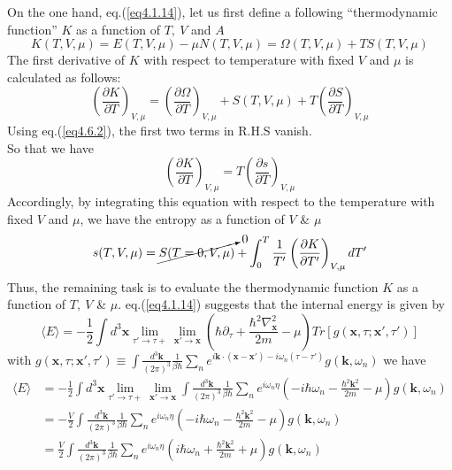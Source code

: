 On the one hand, eq.(\ref{eq4.1.14}), let us first define a following ``thermodynamic function'' $K$ as a function of $T,\ V$ and $A$
\begin{equation}
K(T,V,\mu)=E(T,V,\mu)-\mu N(T,V,\mu)=\Omega(T,V,\mu)+TS(T,V,\mu)
\end{equation}
The first derivative of $K$ with respect to temperature with fixed $V$ and $\mu$ is calculated as follows:
\[
\left( \frac{\partial K}{\partial T}\right)_{V,\mu}=\left( \frac{\partial \Omega}{\partial T}\right)_{V,\mu}+S(T,V,\mu)+T\left( \frac{\partial S}{\partial T}\right)_{V,\mu}
\]
Using eq.(\ref{eq4.6.2}), the first two terms in R.H.S vanish.\\
So that we have
\begin{equation}
\left( \frac{\partial K}{\partial T}\right)_{V,\mu}=T\left( \frac{\partial s}{\partial T}\right)_{V,\mu}
\end{equation}
Accordingly, by integrating this equation with respect to the temperature with fixed $V$ and $\mu$, we have the entropy as a function of $V$ \& $\mu$
\begin{equation}
s(T,V,\mu)=\cancelto{0}{S(T=0,V,\mu)}+\int_0^T\frac{1}{T'}\left( \frac{\partial K}{\partial T'}\right)_{V,\mu} dT'
\end{equation}
Thus, the remaining task is to evaluate the thermodynamic function $K$ as a function of $T,\ V$ \& $\mu$.
eq.(\ref{eq4.1.14}) suggests that the internal energy is given by
\[
\langle E \rangle=-\frac{1}{2}\int d^3\mathbf{x} \lim_{\tau'\to \tau+} \lim_{\mathbf{x}'\to\mathbf{x}}\left(\hbar \partial_\tau +\frac{\hbar^2\nabla^2_\mathbf{x}}{2m}-\mu\right) Tr[g(\mathbf{x},\tau;\mathbf{x}',\tau')]
\]
with $g(\mathbf{x},\tau;\mathbf{x}',\tau')\equiv\int \frac{d^3\mathbf{k}}{(2\pi)^3}\frac{1}{\beta\hbar}\sum_n e^{i\mathbf{k}\cdot(\mathbf{x}-\mathbf{x}')-i\omega_n(\tau-\tau')}g(\mathbf{k},\omega_n)$
we have 
\begin{equation}\label{eq4.6.9}
\begin{aligned}
\langle E \rangle&=-\frac{1}{2}\int d^3 \mathbf{x} \lim_{\tau'\to \tau+} \lim_{\mathbf{x}'\to\mathbf{x}} \int \frac{d^3 \mathbf{k}}{(2\pi)^3} \frac{1}{\beta\hbar} \sum_n e^{i\omega_n \eta}\left(-i\hbar\omega_n-\frac{\hbar^2\mathbf{k}^2}{2m}-\mu\right)g(\mathbf{k},\omega_n)\\
&=-\frac{V}{2} \int \frac{d^3 \mathbf{k}}{(2\pi)^3} \frac{1}{\beta\hbar} \sum_n e^{i\omega_n \eta}\left(-i\hbar\omega_n-\frac{\hbar^2\mathbf{k}^2}{2m}-\mu\right)g(\mathbf{k},\omega_n)\\
&=\frac{V}{2} \int \frac{d^3 \mathbf{k}}{(2\pi)^3} \frac{1}{\beta\hbar} \sum_n e^{i\omega_n \eta}\left(i\hbar\omega_n+\frac{\hbar^2\mathbf{k}^2}{2m}+\mu\right)g(\mathbf{k},\omega_n)
\end{aligned}
\end{equation}
